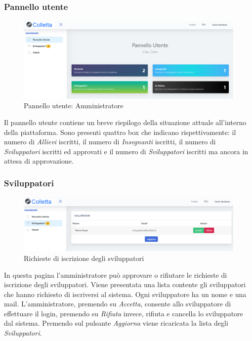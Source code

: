		\subsubsection{Pannello utente}
			\begin{figure}[H]
				\centering
				\includegraphics[width=17cm]{sez/img/amministratore/panelloadmin.PNG}
				\caption{Pannello utente: Amministratore}\label{fig:1}
			\end{figure}
		Il pannello utente contiene un breve riepilogo della situazione attuale all'interno della piattaforma.
		Sono presenti quattro box che indicano rispettivamente: il numero di \textit{Allievi} iscritti, il numero di \textit{Insegnanti} iscritti, il numero di \textit{Sviluppatori} iscritti ed approvati e il numero di \textit{Sviluppatori} iscritti ma ancora in attesa di approvazione.

		\subsubsection{Sviluppatori}
			\begin{figure}[H]
				\centering
				\includegraphics[width=17cm]{sez/img/amministratore/conf_ric_svil.PNG}
				\caption{Richieste di iscrizione degli sviluppatori}\label{fig:1}
			\end{figure}
		  In questa pagina l'amministratore può approvare o rifiutare le richieste di iscrizione degli sviluppatori. Viene presentata una lista contente gli sviluppatori che hanno richiesto di iscriversi al sistema. Ogni sviluppatore ha un nome e una mail. L'amministratore, premendo su \textit{Accetta}, consente allo sviluppatore di effettuare il login, premendo su \textit{Rifiuta} invece, rifiuta e cancella lo sviluppatore dal sistema. Premendo sul pulsante \textit{Aggiorna} viene ricaricata la lista degli \textit{Sviluppatori}.


